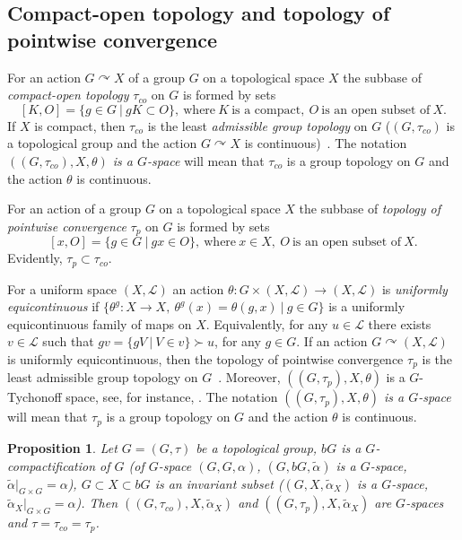 \documentclass{amsart}
\newtheorem{pro}[thm]{Proposition}
\begin{document}

\subsection{Compact-open topology and topology of pointwise convergence}\label{topolco} 

For an action $G\curvearrowright X$ of a group $G$ on a topological space $X$ the subbase of {\it compact-open topology} $\tau_{co}$ on $G$ is formed by sets 
$$[K, O]=\{g\in G\ |\ gK\subset O\},\ \mbox{where}\ K\ \mbox{is a compact},\ O\ \mbox{is an open subset of}\ X.$$
If $X$ is compact, then $\tau_{co}$ is the least {\it admissible group topology} on $G$ ($(G, \tau_{co})$ is a topological group and the action $G\curvearrowright X$ is continuous)~\cite{Arens}. The notation {\it $((G, \tau_{co}), X, \theta)$ is a $G$-space} will mean that $\tau_{co}$ is a group topology on $G$ and the action $\theta$ is continuous.

For an action of a group $G$ on a topological space $X$ the subbase of {\it topology of pointwise convergence} $\tau_p$ on $G$ is formed by sets 
$$[x, O]=\{g\in G\ |\ gx\in O\},\ \mbox{where}\ x\in X,\ O\ \mbox{is an open subset of}\ X.$$
Evidently, $\tau_p\subset\tau_{co}$.

For a uniform space $(X, \mathcal L)$ an action $\theta: G\times (X, \mathcal L)\to  (X, \mathcal L)$ is {\it uniformly equicontinuous} if $\{\theta^g: X\to X,\ \theta^g(x)=\theta (g, x)\ |\ g\in G\}$  is a uniformly equicontinuous family of maps on $X$. Equivalently, for any $u\in\mathcal L$ there exists $v\in\mathcal L$  such that $gv=\{gV\ |\ V\in v\}\succ u$, for any $g\in G$. 
If an action  $G\curvearrowright (X, \mathcal L)$ is uniformly equicontinuous, then the topology of pointwise convergence $\tau_p$ is the least admissible group topology on $G$~\cite[Lemma 3.1]{Kozlov2022}. Moreover, $((G, \tau_p), X, \theta)$ is a $G$-Tychonoff space, see, for instance, \cite{Megr1984}. The notation  {\it $((G, \tau_{p}), X, \theta)$ is a $G$-space} will mean that $\tau_{p}$ is a group topology on $G$ and the action $\theta$ is continuous.

\begin{pro}\label{topcoex} 
Let $G=(G, \tau)$ be a topological group, $b G$ is a $G$-compactification of $G$ {\rm(}of $G$-space $(G, G, \alpha)$, $(G, b G, \tilde\alpha)$ is a $G$-space, $\tilde\alpha|_{G\times G}=\alpha${\rm)}, $G\subset X\subset b G$ is an invariant subset {\rm(}$(G, X, \tilde\alpha_X)$ is a $G$-space, $\tilde\alpha_X|_{G\times G}=\alpha${\rm)}. Then $((G, \tau_{co}), X, \tilde\alpha_X)$ and $((G, \tau_p), X, \tilde\alpha_X)$ are $G$-spaces and $\tau=\tau_{co}=\tau_p$. 
\end{pro}
\end{document}
